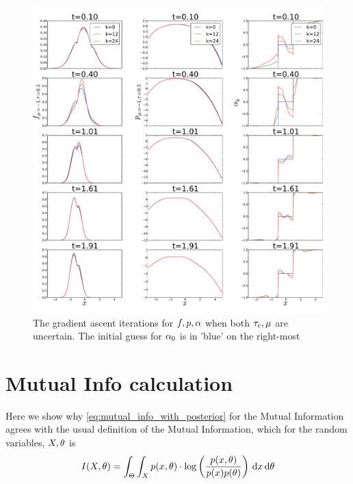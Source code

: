 \documentclass{article}
\begin{document}
\begin{figure}[htp]
\begin{center}
  \includegraphics[width=1\textwidth]{Figs/OUFBSolver_BetaMu/FB_alpha_iterates_uICs_5_Tf=2.pdf}
  \caption[tableofCs]{The gradient ascent iterations for $f,p,{\alpha}$ when both
  ${ \tau_{c} }, {\mu }$ are uncertain. The initial guess for ${\alpha}_0$ is in 'blue' on the
  right-most }
  \label{fig:fpalpha_iterates_mubeta}
\end{center}
\end{figure}





\clearpage
\appendix
\section{Mutual Info calculation}
\label{sec:mutual_info_defn} 
Here we show why \cref{eq:mutual_info_with_posterior} for
the Mutual Information agrees with the usual definition of the Mutual Information, which
for the random variables, $X,{\theta}$ is
\begin{equation}
I(X,{\theta}) = \int_\Theta \int_X p(x,{\theta}) \cdot \log \left(
\frac{p(x,{\theta})}{p(x)p({\theta})}\right) \, \mathrm{d} x \, \mathrm{d} {\theta}
\label{eq:mutual_info_defn}
\end{equation}
 
\end{document}
